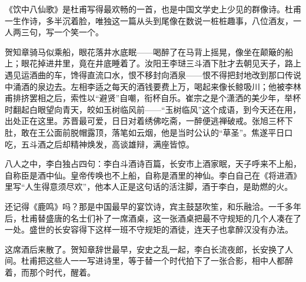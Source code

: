 \begin{appreciation}
《饮中八仙歌》是杜甫写得最欢畅的一首，也是中国文学史上少见的群像诗。杜甫一生作诗，多半沉着脸，唯独这一篇从头到尾像在数说一桩桩趣事，八位酒友，一人两三句，写一个笑一个。

贺知章骑马似乘船，眼花落井水底眠——喝醉了在马背上摇晃，像坐在颠簸的船上；眼花掉进井里，竟在井底睡着了。汝阳王李琎三斗酒下肚才去朝见天子，路上遇见运酒曲的车，馋得直流口水，恨不移封向酒泉——恨不得把封地改到那口传说中涌酒的泉边去。左相李适之每天的酒钱要费上万，喝起来像长鲸吸川；他被李林甫排挤罢相之后，索性以“避贤”自嘲，衔杯自乐。崔宗之是个潇洒的美少年，举杯时翻起白眼望向青天，皎如玉树临风前——“玉树临风”这个成语，到今天还在用，出处正在这里。苏晋最可爱，日日对着绣佛吃斋，一醉便逃禅破戒。张旭三杯下肚，敢在王公面前脱帽露顶，落笔如云烟，他是当时公认的“草圣”。焦遂平日口吃，五斗酒之后却精神焕发，高谈雄辩，满座皆惊。

八人之中，李白独占四句：李白斗酒诗百篇，长安市上酒家眠，天子呼来不上船，自称臣是酒中仙。皇帝传唤也不上船，自称是酒里的神仙。李白自己在《将进酒》里写“人生得意须尽欢”，他本人正是这句话的活注脚，酒于李白，是助燃的火。

还记得《鹿鸣》吗？那是中国最早的宴饮诗，宾主鼓瑟吹笙，和乐融洽。一千多年后，杜甫替盛唐的名士们补了一席酒桌，这一张酒桌把最不守规矩的几个人凑在了一处。盛世的长安容得下这样一班不守规矩的酒徒，连天子也拿醉汉没有办法。

这席酒后来散了。贺知章辞世最早，安史之乱一起，李白长流夜郎，长安换了人间。杜甫把这些人一一写进诗里，等于替一个时代拍下了一张合影，相中人都醉着，而那个时代，醒着。
\end{appreciation}
